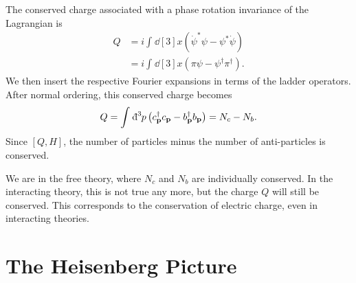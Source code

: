 The conserved charge associated with a phase rotation invariance of the Lagrangian is
\begin{align}
  Q &= i \int_{}^{} \dd[3]{x} (\dot \psi^* \psi - \psi^* \dot \psi) \\
    &= i \int_{}^{} \dd[3]{x} (\pi \psi - \psi^{\dagger} \pi^{\dagger}).
\end{align}
We then insert the respective Fourier expansions in terms of the ladder operators. After normal ordering, this conserved charge becomes
\begin{equation}
  Q = \int_{}^{} \bdd[3]{p} \left( c^{\dagger}_{\vb{p}} c_{\vb{p}} - b^{\dagger}_{\vb{p}} b_{\vb{p}} \right) = N_c - N_b.
\end{equation}
Since $[Q, H]$, the number of particles minus the number of anti-particles is conserved.
\begin{leftbar}
  \begin{remark}
    We are in the free theory, where $N_c$ and $N_b$ are individually conserved. In the interacting theory, this is not true any more, but the charge $Q$ will still be conserved.
    This corresponds to the conservation of electric charge, even in interacting theories.
  \end{remark}
\end{leftbar}

\section{The Heisenberg Picture}%
\label{sec:the_heisenberg_picture}

